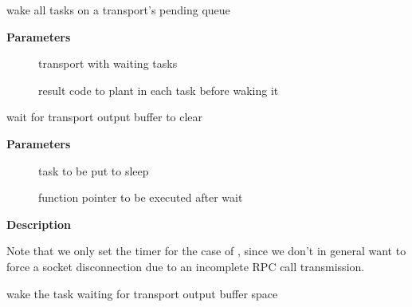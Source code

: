 \documentclass[a4paper,8pt,english]{sphinxmanual}
\begin{document}
\begin{fulllineitems}
\label{networking/kapi:c.xprt_wake_pending_tasks}
wake all tasks on a transport's pending queue

\end{fulllineitems}


\textbf{Parameters}
\begin{description}
\item[{}] \leavevmode
transport with waiting tasks

\item[{}] \leavevmode
result code to plant in each task before waking it

\end{description}

\begin{fulllineitems}
\label{networking/kapi:c.xprt_wait_for_buffer_space}
wait for transport output buffer to clear

\end{fulllineitems}


\textbf{Parameters}
\begin{description}
\item[{}] \leavevmode
task to be put to sleep

\item[{}] \leavevmode
function pointer to be executed after wait

\end{description}

\textbf{Description}

Note that we only set the timer for the case of , since
we don't in general want to force a socket disconnection due to
an incomplete RPC call transmission.

\begin{fulllineitems}
\label{networking/kapi:c.xprt_write_space}
wake the task waiting for transport output buffer space

\end{fulllineitems}
\end{document}
